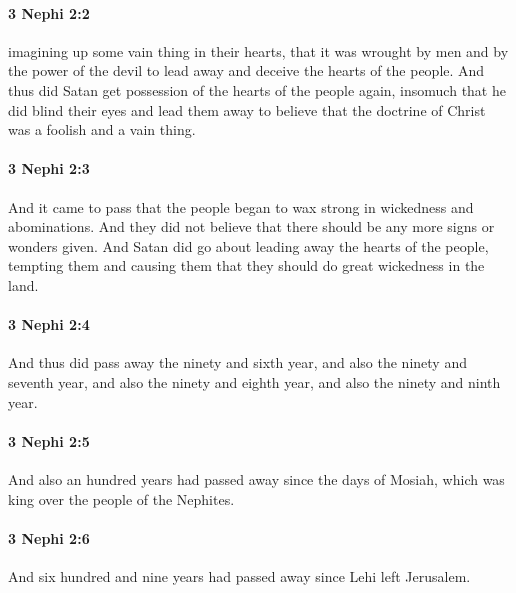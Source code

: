 		\paragraph{3 Nephi 2:2} %
			\label{3NEPHI-2-2}

			imagining up some vain thing in their hearts,
			that it was wrought by men and by the power of the devil
			to lead away and deceive the hearts of the people.
			And thus did Satan get possession of the hearts of the people again,
			insomuch that he did blind their eyes
			and lead them away to believe
			that the doctrine of Christ was a foolish and a vain thing.

		\paragraph{3 Nephi 2:3} %
			\label{3NEPHI-2-3}

			And it came to pass that
			the people began to wax strong in wickedness and abominations.
			And they did not believe that there should be any more signs or wonders given.
			And Satan did go about leading away the hearts of the people,
			tempting them and causing them that they should do great wickedness in the land.

		\paragraph{3 Nephi 2:4} %
			\label{3NEPHI-2-4}

			And thus did pass away the ninety and sixth year,
			and also the ninety and seventh year,
			and also the ninety and eighth year,
			and also the ninety and ninth year.

		\paragraph{3 Nephi 2:5} %
			\label{3NEPHI-2-5}

			And also an hundred years had passed away
			since the days of Mosiah, which was king over the people of the Nephites.

		\paragraph{3 Nephi 2:6} %
			\label{3NEPHI-2-6}

			And six hundred and nine years had passed away since Lehi left Jerusalem.


